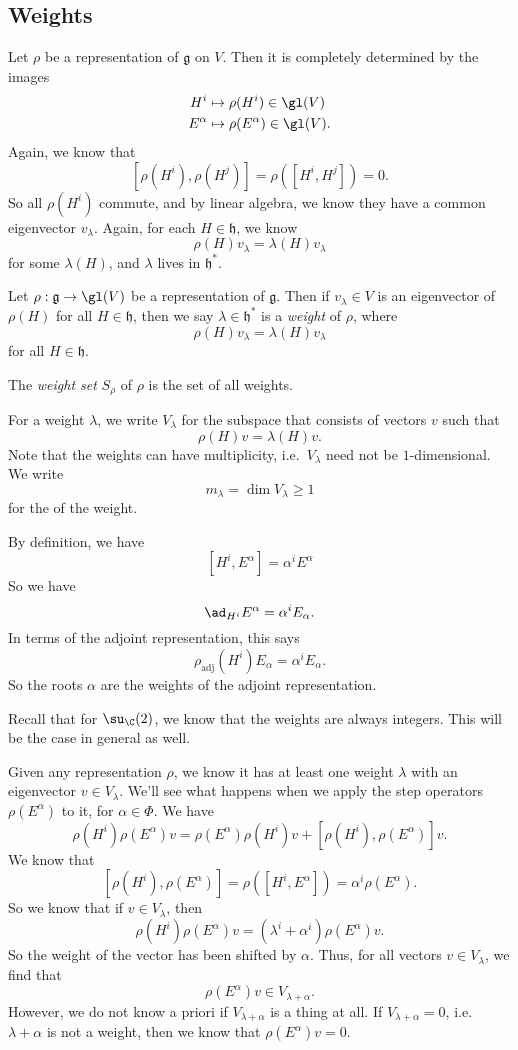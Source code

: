 \documentclass[a4paper]{article}
\begin{document}
\subsection{Weights}
Let $\rho$ be a representation of $\mathfrak{g}$ on $V$. Then it is completely determined by the images
\begin{align*}
  H^i &\mapsto \rho(H^i) \in \gl(V)\\
  E^\alpha &\mapsto \rho(E^\alpha) \in \gl(V).
\end{align*}
Again, we know that
\[
  [\rho(H^i), \rho(H^j)] = \rho([H^i, H^j]) = 0.
\]
So all $\rho(H^i)$ commute, and by linear algebra, we know they have a common eigenvector $v_\lambda$. Again, for each $H \in \mathfrak{h}$, we know
\[
  \rho(H) v_\lambda = \lambda(H) v_\lambda
\]
for some $\lambda(H)$, and $\lambda$ lives in $\mathfrak{h}^*$.
\begin{defi}
  Let $\rho: \mathfrak{g} \to \gl(V)$ be a representation of $\mathfrak{g}$. Then if $v_\lambda \in V$ is an eigenvector of $\rho(H)$ for all $H \in \mathfrak{h}$, then we say $\lambda\in \mathfrak{h}^*$ is a \emph{weight} of $\rho$, where
  \[
    \rho(H) v_\lambda = \lambda(H) v_\lambda
  \]
  for all $H \in \mathfrak{h}$.

  The \emph{weight set} $S_\rho$ of $\rho$ is the set of all weights.
\end{defi}
For a weight $\lambda$, we write $V_\lambda$ for the subspace that consists of vectors $v$ such that
\[
  \rho(H) v = \lambda(H) v.
\]
Note that the weights can have multiplicity, i.e.\ $V_\lambda$ need not be $1$-dimensional. We write
\[
  m_\lambda = \dim V_\lambda \geq 1
\]
for the  of the weight.

\begin{eg}
  By definition, we have
  \[
    [H^i, E^\alpha] = \alpha^i E^\alpha
  \]
  So we have
  \[
    \ad_{H^i} E^\alpha = \alpha^i E_\alpha.
  \]
  In terms of the adjoint representation, this says
  \[
    \rho_{\mathrm{adj}} (H^i) E_\alpha = \alpha^i E_\alpha.
  \]
  So the roots $\alpha$ are the weights of the adjoint representation.
\end{eg}
Recall that for $\su_\C(2)$, we know that the weights are always integers. This will be the case in general as well.

Given any representation $\rho$, we know it has at least one weight $\lambda$ with an eigenvector $v \in V_\lambda$. We'll see what happens when we apply the step operators $\rho(E^\alpha)$ to it, for $\alpha \in \Phi$. We have
\[
  \rho(H^i) \rho(E^\alpha)v = \rho(E^\alpha) \rho(H^i) v + [\rho(H^i), \rho(E^\alpha)] v.
\]
We know that
\[
  [\rho(H^i), \rho(E^\alpha)] = \rho([H^i, E^\alpha]) = \alpha^i \rho(E^\alpha).
\]
So we know that if $v \in V_\lambda$, then
\[
  \rho(H^i)\rho(E^\alpha)v = (\lambda^i + \alpha^i) \rho(E^\alpha) v.
\]
So the weight of the vector has been shifted by $\alpha$. Thus, for all vectors $v \in V_\lambda$, we find that
\[
  \rho(E^\alpha) v \in V_{\lambda + \alpha}.
\]
However, we do not know a priori if $V_{\lambda + \alpha}$ is a thing at all. If $V_{\lambda + \alpha} = 0$, i.e.\ $\lambda + \alpha$ is not a weight, then we know that $\rho(E^\alpha) v = 0$.
\end{document}

